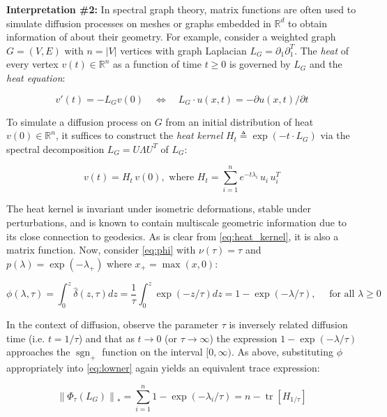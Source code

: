 \documentclass[pdflatex,sn-mathphys-num]{sn-jnl}
\begin{document}
\textbf{Interpretation \#2:} In spectral graph theory, matrix functions are often used to simulate diffusion processes on meshes or graphs embedded in \(\mathbb{R}^{d}\) to obtain information of about their geometry. For example, consider a weighted graph \(G = (V,E)\) with \(n = |V|\) vertices with graph Laplacian \(L_{G} = \partial_{1}\partial_{1}^{T}\). The \emph{heat} of every vertex \(v(t) \in \mathbb{R}^{n}\) as a function of time \(t \geq 0\) is governed by \(L_{G}\) and the \emph{heat equation}:

\[v'(t) = - L_{G}v(0)\quad \Leftrightarrow \quad L_{G} \cdot u(x,t) = - \partial u(x,t)/\partial t\] \protect{}\label{eq:heat_eq}{}

To simulate a diffusion process on \(G\) from an initial distribution of heat \(v(0) \in \mathbb{R}^{n}\), it suffices to construct the \emph{heat kernel} \(H_{t} \triangleq \exp \left( - t \cdot L_{G} \right) \) via the spectral decomposition \(L_{G} = U\Lambda U^{T}\) of \(L_{G}\):

\[v(t) = H_{t}\, v(0),\text{ where }H_{t} = \sum_{i = 1}^{n}e^{- t\lambda_{i}}\, u_{i}\, u_{i}^{T}\] \protect{}\label{eq:heat_kernel}{}

The heat kernel is invariant under isometric deformations, stable under perturbations, and is known to contain multiscale geometric information due to its close connection to geodesics. As is clear from \ref{eq:heat_kernel}, it is also a matrix function. Now, consider \ref{eq:phi} with \(\nu(\tau) = \tau\) and \(p(\lambda) = \exp\left( - \lambda_{+} \right)\) where \(x_{+} = \max(x,0)\):

\[\phi(\lambda,\tau) = \int_{0}^{z}\hat{\delta}(z,\tau)dz = \frac{1}{\tau}\int_{0}^{z}\exp( - z/\tau)dz = 1 - \exp( - \lambda/\tau),\quad\text{ for all }\lambda \geq 0\] \protect{}\label{eq:heat_sf}{}

In the context of diffusion, observe the parameter \(\tau\) is inversely related diffusion time (i.e. \(t = 1/\tau\)) and that as \(t \rightarrow 0\) (or \(\tau \rightarrow \infty\)) the expression \(1 - \exp( - \lambda/\tau)\) approaches the \(\operatorname{sgn}_{+}\) function on the interval \([ 0,\infty)\). As above, substituting \(\phi\) appropriately into \ref{eq:lowner} again yields an equivalent trace expression:

\[\left\| {\Phi_{\tau}\left( L_{G} \right)} \right\|_{\ast} = \sum_{i = 1}^{n}1 - \exp\left( - \lambda_{i}/\tau \right) = n - \operatorname{tr} \left[ H_{1/\tau} \right] \] \protect{}\label{eq:heat_trace}{}
\end{document}
